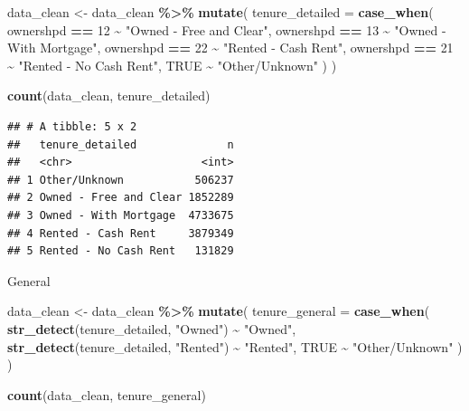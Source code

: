 \documentclass[
]{article}
\newenvironment{Shaded}{\begin{snugshade}}{\end{snugshade}}
\newcommand{\AttributeTok}[1]{\textcolor[rgb]{0.13,0.29,0.53}{#1}}
\newcommand{\ConstantTok}[1]{\textcolor[rgb]{0.56,0.35,0.01}{#1}}
\newcommand{\DecValTok}[1]{\textcolor[rgb]{0.00,0.00,0.81}{#1}}
\newcommand{\FunctionTok}[1]{\textcolor[rgb]{0.13,0.29,0.53}{\textbf{#1}}}
\newcommand{\NormalTok}[1]{#1}
\newcommand{\OtherTok}[1]{\textcolor[rgb]{0.56,0.35,0.01}{#1}}
\newcommand{\SpecialCharTok}[1]{\textcolor[rgb]{0.81,0.36,0.00}{\textbf{#1}}}
\newcommand{\StringTok}[1]{\textcolor[rgb]{0.31,0.60,0.02}{#1}}
\begin{document}
\begin{Shaded}
\begin{Highlighting}[]
\NormalTok{data\_clean }\OtherTok{\textless{}{-}}\NormalTok{ data\_clean }\SpecialCharTok{\%\textgreater{}\%}
  \FunctionTok{mutate}\NormalTok{(}
    \AttributeTok{tenure\_detailed =} \FunctionTok{case\_when}\NormalTok{(}
\NormalTok{      ownershpd }\SpecialCharTok{==} \DecValTok{12} \SpecialCharTok{\textasciitilde{}} \StringTok{"Owned {-} Free and Clear"}\NormalTok{,}
\NormalTok{      ownershpd }\SpecialCharTok{==} \DecValTok{13} \SpecialCharTok{\textasciitilde{}} \StringTok{"Owned {-} With Mortgage"}\NormalTok{,}
\NormalTok{      ownershpd }\SpecialCharTok{==} \DecValTok{22} \SpecialCharTok{\textasciitilde{}} \StringTok{"Rented {-} Cash Rent"}\NormalTok{,}
\NormalTok{      ownershpd }\SpecialCharTok{==} \DecValTok{21} \SpecialCharTok{\textasciitilde{}} \StringTok{"Rented {-} No Cash Rent"}\NormalTok{,}
      \ConstantTok{TRUE} \SpecialCharTok{\textasciitilde{}} \StringTok{"Other/Unknown"}
\NormalTok{    )}
\NormalTok{  )}

\FunctionTok{count}\NormalTok{(data\_clean, tenure\_detailed)}
\end{Highlighting}
\end{Shaded}

\begin{verbatim}
## # A tibble: 5 x 2
##   tenure_detailed              n
##   <chr>                    <int>
## 1 Other/Unknown           506237
## 2 Owned - Free and Clear 1852289
## 3 Owned - With Mortgage  4733675
## 4 Rented - Cash Rent     3879349
## 5 Rented - No Cash Rent   131829
\end{verbatim}

General

\begin{Shaded}
\begin{Highlighting}[]
\NormalTok{data\_clean }\OtherTok{\textless{}{-}}\NormalTok{ data\_clean }\SpecialCharTok{\%\textgreater{}\%}
  \FunctionTok{mutate}\NormalTok{(}
    \AttributeTok{tenure\_general =} \FunctionTok{case\_when}\NormalTok{(}
      \FunctionTok{str\_detect}\NormalTok{(tenure\_detailed, }\StringTok{"Owned"}\NormalTok{) }\SpecialCharTok{\textasciitilde{}} \StringTok{"Owned"}\NormalTok{,}
      \FunctionTok{str\_detect}\NormalTok{(tenure\_detailed, }\StringTok{"Rented"}\NormalTok{) }\SpecialCharTok{\textasciitilde{}} \StringTok{"Rented"}\NormalTok{,}
      \ConstantTok{TRUE} \SpecialCharTok{\textasciitilde{}} \StringTok{"Other/Unknown"}
\NormalTok{    )}
\NormalTok{  )}

\FunctionTok{count}\NormalTok{(data\_clean, tenure\_general)}
\end{Highlighting}
\end{Shaded}
\end{document}

